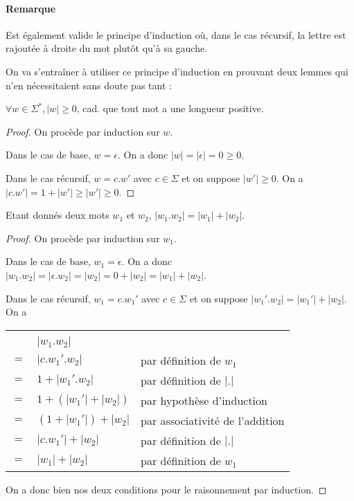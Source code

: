 \paragraph*{Remarque} Est également valide le principe d'induction où, dans le cas récursif, la lettre est rajoutée à droite du mot plutôt qu'à sa gauche.


On va s'entraîner à utiliser ce principe d'induction en prouvant deux lemmes qui n'en nécessitaient sans doute pas tant :

\begin{lemma}
$\forall w \in \Sigma^*, |w| \geq 0$, cad. que tout mot a une longueur positive.
\end{lemma}
\begin{proof}
On procède par induction sur $w$.

Dans le cas de base, $w = \epsilon$. On a donc $|w| = |\epsilon| = 0 \geq 0$.

Dans le cas récursif, $w = c.w'$ avec $c \in \Sigma$ et on suppose $|w'| \geq 0$. On a $|c.w'| = 1 + |w'| \geq |w'| \geq 0$.
\end{proof}


\begin{lemma}
Etant donnés deux mots $w_1$ et $w_2$, $|w_1.w_2| = |w_1| + |w_2|$. 
\end{lemma}

\begin{proof}
On procède par induction sur $w_1$.

Dans le cas de base, $w_1 = \epsilon$. On a donc $|w_1.w_2| = |\epsilon.w_2| = |w_2| = 0 + |w_2| = |w_1| + |w_2|$.

Dans le cas récursif, $w_1 = c.w_1'$ avec $c \in \Sigma$ et on suppose $|w_1'.w_2| = |w_1'| + |w_2|$. On a
\begin{tabular}{cll}
&&\\
& $|w_1.w_2|$ & \\
$=$ & $|c.w_1'.w_2|$ & par définition de $w_1$ \\
$=$&  $1 + |w_1'.w_2|$ & par définition de $|.|$ \\
$=$& $1 + (|w_1'| + |w_2|)$ & par hypothèse d'induction \\
$=$& $(1 + |w_1'|) + |w_2|$ & par associativité de l'addition \\
$=$& $|c.w_1'| + |w_2|$ & par définition de $|.|$ \\
$=$& $|w_1| + |w_2|$ & par définition de $w_1$
\end{tabular}

On a donc bien nos deux conditions pour le raisonnement par induction.
\end{proof}


